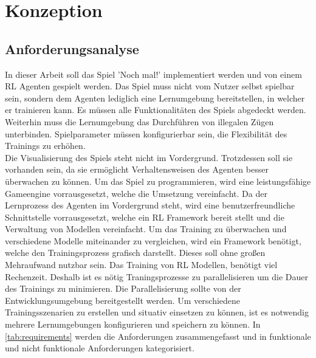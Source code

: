 
\clearpage
\chapter{Konzeption}
\section{Anforderungsanalyse}
In dieser Arbeit soll das Spiel 'Noch mal!' implementiert werden und von einem RL Agenten gespielt werden. Das Spiel muss nicht vom Nutzer selbst spielbar sein, sondern dem Agenten lediglich eine Lernumgebung bereitstellen, in welcher er trainieren kann. Es müssen alle Funktionalitäten des Spiels abgedeckt werden. Weiterhin muss die Lernumgebung das Durchführen von illegalen Zügen unterbinden. Spielparameter müssen konfigurierbar sein, die Flexibilität des Trainings zu erhöhen.\\
Die Visualisierung des Spiels steht nicht im Vordergrund. Trotzdessen soll sie vorhanden sein, da sie ermöglicht Verhaltensweisen des Agenten besser überwachen zu können. Um das Spiel zu programmieren, wird eine leistungsfähige Gameengine vorrausgesetzt, welche die Umsetzung vereinfacht. Da der Lernprozess des Agenten im Vordergrund steht, wird eine benutzerfreundliche Schnittstelle vorrausgesetzt, welche ein RL Framework bereit stellt und die Verwaltung von Modellen vereinfacht. Um das Training zu überwachen und verschiedene Modelle miteinander zu vergleichen, wird ein Framework benötigt, welche den Trainingsprozess grafisch darstellt. Dieses soll ohne großen Mehraufwand nutzbar sein. Das Training von RL Modellen, benötigt viel Rechenzeit. Deshalb ist es nötig Traningsprozesse zu parallelisieren um die Dauer des Trainings zu minimieren. Die Parallelisierung sollte von der Entwicklungsumgebung bereitgestellt werden. Um verschiedene Trainingsszenarien zu erstellen und situativ einsetzen zu können, ist es notwendig mehrere Lernumgebungen konfigurieren und speichern zu können. 
In \ref{tab:requirements} werden die Anforderungen zusammengefasst und in funktionale und nicht funktionale Anforderungen kategorisiert.

